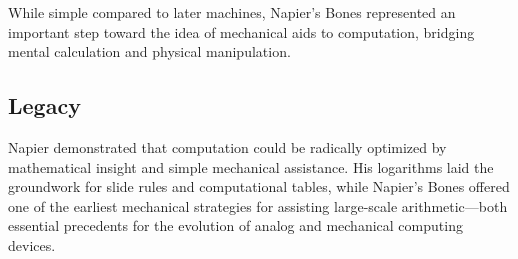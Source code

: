 While simple compared to later machines, Napier's Bones represented an important step toward the idea of mechanical aids to computation, bridging mental calculation and physical manipulation.

\subsection{Legacy}

Napier demonstrated that computation could be radically optimized by mathematical insight and simple mechanical assistance. His logarithms laid the groundwork for slide rules and computational tables, while Napier's Bones offered one of the earliest mechanical strategies for assisting large-scale arithmetic---both essential precedents for the evolution of analog and mechanical computing devices.

